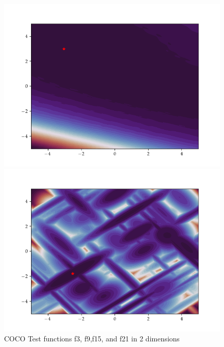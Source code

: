 \begin{figure}[h]
\begin{minipage}[b]{0.24\textwidth}
    \includegraphics[trim=2.5cm 1.3cm 2.5cm 1.3cm,clip,width=\textwidth]{Figures/coco/f15.png}
  \end{minipage}
  \hfill
  \begin{minipage}[b]{0.24\textwidth}
    \includegraphics[trim=2.5cm 1.3cm 2.5cm 1.3cm,clip,width=\textwidth]{Figures/coco/f21.png}
  \end{minipage}
  
  \caption{COCO Test functions f3, f9,f15, and f21 in 2 dimensions}
  \label{COCO_tests}
\end{figure}

